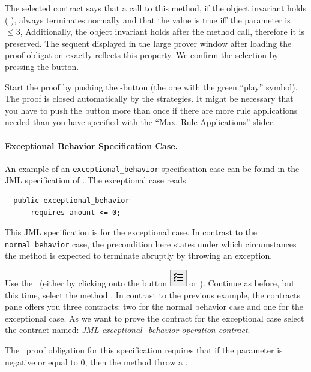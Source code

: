 The selected contract says that a call to this method, if the object 
invariant holds  ( ), always
terminates normally and that the  value is true iff
the parameter  is $\leq 3$, 
Additionally, the object invariant holds after the method call, 
therefore it is preserved.
The sequent displayed in the large prover window after loading the proof
obligation exactly reflects this property.
We confirm the selection by pressing the  button.
  
Start the
proof by pushing the -button (the one with the green
``play'' symbol). The proof is closed automatically by the
strategies. It might be necessary that you have to push the button
more than once if there are more rule applications needed than you
have specified with the ``Max. Rule Applications'' slider.

\paragraph{Exceptional Behavior Specification Case.}
An example of an \texttt{exceptional\_behavior} specification case can be found
in the JML specification of . The exceptional case reads
\begin{verbatim}
  public exceptional_behavior
      requires amount <= 0;
\end{verbatim}

This JML specification is for the exceptional case. In contrast to the
\texttt{normal\_behavior} case, the precondition here states under which
circumstances the method is expected to terminate abruptly by throwing
an exception. 

Use the \prm\ (either by clicking onto the button 
\includegraphics[height=2ex]{../figures/proofManagementButton} 
or ).
Continue as before, but this time, select the method
. In contrast to
the previous example, the contracts pane offers you three contracts: two for the
normal behavior case and one for the exceptional case. As we want to
prove the contract for the exceptional case select the contract named:
\emph{JML exceptional\_behavior operation contract}. 

The \KeY\ proof obligation for this specification requires that if the
parameter  is negative or equal to $0$, then the method
throw a .

